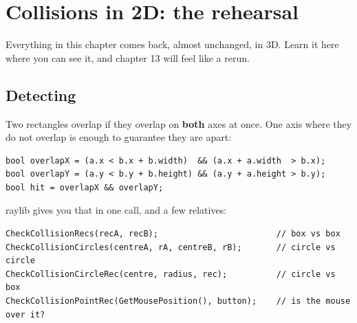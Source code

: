 \chapter{Collisions in 2D: the rehearsal}

Everything in this chapter comes back, almost unchanged, in 3D. Learn it here
where you can see it, and chapter 13 will feel like a rerun.

\section{Detecting}

Two rectangles overlap if they overlap on \textbf{both} axes at once. One axis
where they do not overlap is enough to guarantee they are apart:

\begin{center}
\end{center}

\begin{lstlisting}
bool overlapX = (a.x < b.x + b.width)  && (a.x + a.width  > b.x);
bool overlapY = (a.y < b.y + b.height) && (a.y + a.height > b.y);
bool hit = overlapX && overlapY;
\end{lstlisting}

raylib gives you that in one call, and a few relatives:

\begin{lstlisting}
CheckCollisionRecs(recA, recB);                        // box vs box
CheckCollisionCircles(centreA, rA, centreB, rB);       // circle vs circle
CheckCollisionCircleRec(centre, radius, rec);          // circle vs box
CheckCollisionPointRec(GetMousePosition(), button);    // is the mouse over it?
\end{lstlisting}

